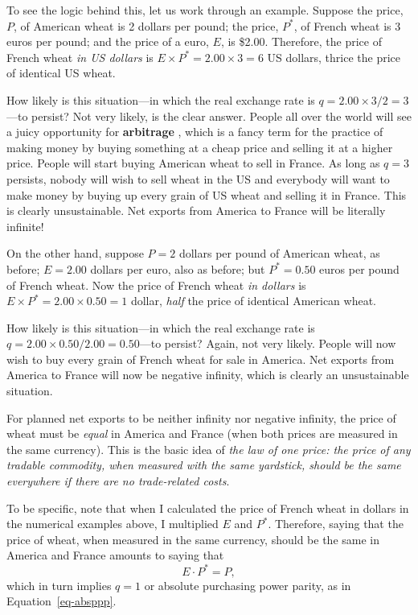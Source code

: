 \documentclass[
  letterpaper,
]{book}
\theoremstyle{plain}
\theoremstyle{remark}
\begin{document}
To see the logic behind this, let us work through an example. Suppose
the price, \(P\), of American wheat is 2 dollars per pound; the price,
\(P^*\), of French wheat is 3 euros per pound; and the price of a euro,
\(E\), is \$2.00. Therefore, the price of French wheat \emph{in US
dollars} is \(E\times P^*=2.00\times 3=6\) US dollars, thrice the price
of identical US wheat.

How likely is this situation---in which the real exchange rate is
\(q=2.00\times 3/2=3\)---to persist? Not very likely, is the clear
answer. People all over the world will see a juicy opportunity for
\textbf{arbitrage} , which is a fancy term for the
practice of making money by buying something at a cheap price and
selling it at a higher price. People will start buying American wheat to
sell in France. As long as \(q=3\) persists, nobody will wish to sell
wheat in the US and everybody will want to make money by buying up every
grain of US wheat and selling it in France. This is clearly
unsustainable. Net exports from America to France will be literally
infinite!

On the other hand, suppose \(P=2\) dollars per pound of American wheat,
as before; \(E=2.00\) dollars per euro, also as before; but \(P^*=0.50\)
euros per pound of French wheat. Now the price of French wheat \emph{in
dollars} is \(E\times P^*=2.00\times 0.50=1\) dollar, \emph{half} the
price of identical American wheat.

How likely is this situation---in which the real exchange rate is
\(q=2.00\times 0.50/2.00=0.50\)---to persist? Again, not very likely.
People will now wish to buy every grain of French wheat for sale in
America. Net exports from America to France will now be negative
infinity, which is clearly an unsustainable situation.

For planned net exports to be neither infinity nor negative infinity,
the price of wheat must be \emph{equal} in America and France (when both
prices are measured in the same currency). This is the basic idea of
\emph{the law of one price: the price of any tradable commodity, when
measured with the same yardstick, should be the same everywhere if there
are no trade-related costs}.

To be specific, note that when I calculated the price of French wheat in
dollars in the numerical examples above, I multiplied \(E\) and \(P^*\).
Therefore, saying that the price of wheat, when measured in the same
currency, should be the same in America and France amounts to saying
that \[
E\cdot P^* = P,
\] which in turn implies \(q=1\) or absolute purchasing power parity, as
in Equation~\ref{eq-absppp}.
\end{document}
